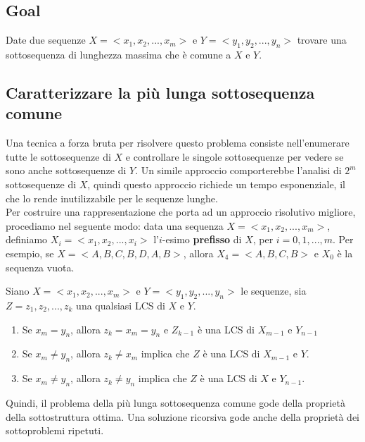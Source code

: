 \subsection{Goal}
\begin{myblockquote}
	Date due sequenze $X = <x_1, x_2, ..., x_m>$ e $Y = <y_1, y_2, ..., y_n>$
	trovare una sottosequenza di lunghezza massima che è comune a $X$ e $Y$.
\end{myblockquote}

\subsection{Caratterizzare la più lunga sottosequenza comune}

Una tecnica a forza bruta per risolvere questo problema consiste
nell'enumerare tutte le sottosequenze di $X$ e controllare le singole
sottosequenze per vedere se sono anche sottosequenze di $Y$. Un simile
approccio comporterebbe l'analisi di $2^m$ sottosequenze di $X$,
quindi questo approccio richiede un tempo esponenziale, il che lo rende
inutilizzabile per le sequenze lunghe.\\

Per costruire una rappresentazione che porta ad un approccio risolutivo
migliore, procediamo nel seguente modo: data una sequenza
$X = <x_1, x_2, ..., x_m>$, definiamo $X_i = <x_1, x_2, ..., x_i>$
l'$i$-esimo \textbf{prefisso} di $X$, per $i=0,1,...,m$. Per
esempio, se $X = <A,B,C,B,D,A,B>$, allora $X_4 = <A,B,C,B>$ e
$X_0$ è la sequenza vuota.

\begin{theorem}
	Siano $X = <x_1, x_2, ..., x_m>$ e $Y = <y_1, y_2, ..., y_n>$ le
	sequenze, sia $Z = z_1, z_2, ..., z_k$ una qualsiasi LCS di $X$ e
	$Y$.

	\begin{enumerate}
		\item Se $x_m = y_n$, allora $z_k = x_m = y_n$ e $Z_{k-1}$ è
		      una LCS di $X_{m-1}$ e $Y_{n-1}$
		\item Se $x_m \ne y_n$, allora
		      $z_k \ne x_m$ implica che $Z$ è una LCS di $X_{m-1}$ e $Y$.
		\item Se $x_m \ne y_n$, allora $z_k \ne y_n$ implica che $Z$ è una LCS
		      di $X$ e $Y_{n-1}$.
	\end{enumerate}
\end{theorem}

Quindi, il problema della più lunga sottosequenza comune gode della
proprietà della sottostruttura ottima. Una soluzione ricorsiva gode
anche della proprietà dei sottoproblemi ripetuti.

